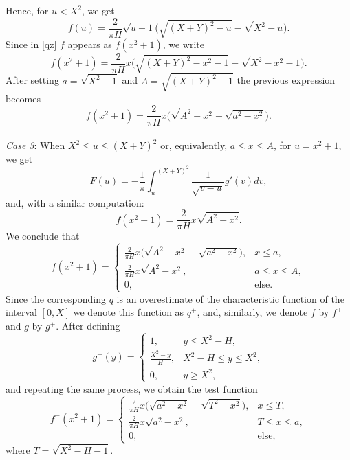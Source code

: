 \documentclass[a4paper,11pt]{amsart}
\theoremstyle{definition}
\begin{document}
Hence, for $u<X^2$, we get $$f(u)= \frac{2}{\pi H}\sqrt{u-1}\Big(\sqrt{(X+Y)^2-u}-\sqrt{X^2-u}\Big).$$
Since in \eqref{qz} $f$ appears as $f(x^2+1)$, we write
$$ f(x^2+1)= \frac{2}{\pi H}x \Big(\sqrt{(X+Y)^2-x^2-1}-\sqrt{X^2-x^2-1}\Big).$$
After setting $a=\sqrt{X^2-1}$ and $A=\sqrt{(X+Y)^2-1}$ the previous expression becomes
$$ f(x^2+1)= \frac{2}{\pi H}x \Big(\sqrt{A^2-x^2}-\sqrt{a^2-x^2}\Big).$$\\
{\it Case 3}:
When $X^2 \le u \le (X+Y)^2$ or, equivalently, $a \le x \le A$, for $u=x^2+1$, we get
$$F(u)= -\frac{1}{\pi} \int_{u}^{(X+Y)^2} \frac{1}{\sqrt{v-u}}g'(v)dv,$$
and, with a similar computation:
$$ f(x^2+1)= \frac{2}{\pi H}x\sqrt{A^2-x^2}.$$
We conclude that
\begin{equation} \label{f+}
f(x^2+1)= 
\begin{cases}
{\frac{2}{\pi H}x \Big(\sqrt{A^2-x^2}-\sqrt{a^2-x^2}\Big)}, & x \le a, \\ 
{\frac{2}{\pi H}x\sqrt{A^2-x^2}}, & a \le x \le A, \\
0, & \text{else}.
\end{cases} 
\end{equation}
Since the corresponding $q$ is an overestimate of the characteristic function of the interval $[0,X]$ we denote this function as $q^{+}$, and, similarly, we denote $f$ by $f^{+}$ and $g$ by $g^{+}$. After defining 
\begin{equation}\label{defg-} g^{-}(y)= 
\begin{cases}
1, & y \le X^2-H, \\
\displaystyle{\frac{X^2-y}{H}}, & X^2-H \le y \le X^2, \\
0, & y \ge X^2,
\end{cases} 
\end{equation}
and repeating the same process, we obtain the test function
\begin{equation} \label{f-}
f^{-}(x^2+1)=
\begin{cases}
{\frac{2}{\pi H}x \Big(\sqrt{a^2-x^2}-\sqrt{T^2-x^2}\Big)}, & x \le T, \\
{\frac{2}{\pi H}x\sqrt{a^2-x^2}}, & T \le x \le a, \\
0, & \text{else},
\end{cases} 
\end{equation}
where $T=\sqrt{X^2-H-1}$. 
\end{document}
